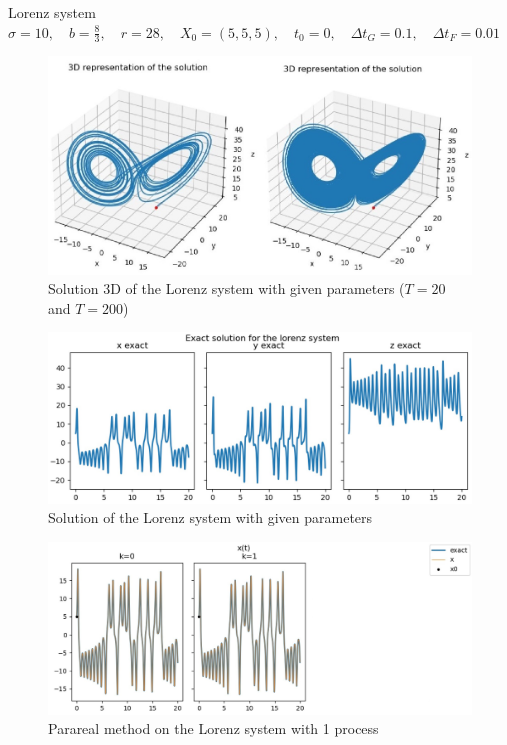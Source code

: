 \begin{frame}[allowframebreaks]{Lorenz system}
	$\sigma=10, \quad b=\frac{8}{3}, \quad r=28, \quad X_0=(5,5,5), \quad t_0=0, \quad \Delta t_G=0.1, \quad \Delta t_F=0.01$
	\begin{figure}
		\centering
		\includegraphics[width=0.7\linewidth]{"images/parareal/lorenz_sol3D.jpg"}
		\caption{Solution 3D of the Lorenz system with given parameters ($T=20$ and $T=200$)}
	\end{figure}

	\newpage

	\begin{minipage}{\linewidth}
	\begin{figure} 
		\centering     
		\includegraphics[width=\linewidth]{"images/parareal/lorenz_exact.jpg"}
		\caption{Solution of the Lorenz system with given parameters}
	\end{figure}
	\end{minipage}

	\newpage
	
	\begin{minipage}{\linewidth}
	\begin{figure}
		\centering       
		\includegraphics[width=0.9\linewidth]{"images/parareal/lorenz_1p.jpg"}
		\caption{Parareal method on the Lorenz system with 1 process}
	\end{figure}
	\end{minipage}


\end{frame}
